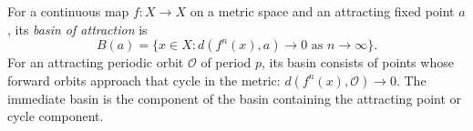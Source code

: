 
For a continuous map $f:X\to X$ on a metric space and an attracting fixed point $a$, its \emph{basin of attraction} is
\[
B(a)=\{x\in X:d(f^n(x),a)\to0\text{ as }n\to\infty\}.
\]
For an attracting periodic orbit $\mathcal O$ of period $p$, its basin consists of points whose forward orbits approach that cycle in the metric: $d(f^n(x),\mathcal O)\to0$. The immediate basin is the component of the basin containing the attracting point or cycle component.

